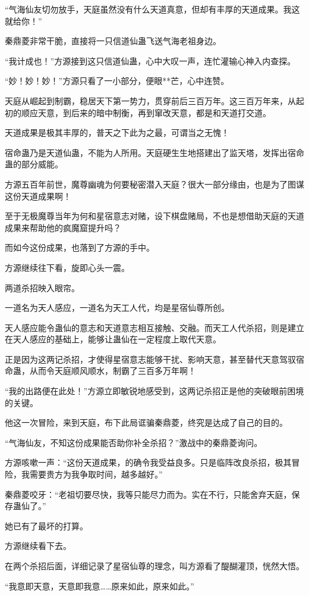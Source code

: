 \begin{this_body}
“气海仙友切勿放手，天庭虽然没有什么天道真意，但却有丰厚的天道成果。我这就给你！”

秦鼎菱非常干脆，直接将一只信道仙蛊飞送气海老祖身边。

“我计成也！”方源接到这只信道仙蛊，心中大叹一声，连忙灌输心神入内查探。

“妙！妙！妙！”方源只看了一小部分，便眼**芒，心中连赞。

天庭从崛起到制霸，稳居天下第一势力，贯穿前后三百万年。这三百万年来，从起初的顺应天意，到后来的暗中制衡，再到窜改天意，都是和天道打交道。

天道成果是极其丰厚的，普天之下此为之最，可谓当之无愧！

宿命蛊乃是天道仙蛊，不能为人所用。天庭硬生生地搭建出了监天塔，发挥出宿命蛊的部分威能。

方源五百年前世，魔尊幽魂为何要秘密潜入天庭？很大一部分缘由，也是为了图谋这份天道成果啊！

至于无极魔尊当年为何和星宿意志对赌，设下棋盘赌局，不也是想借助天庭的天道成果来帮助他的疯魔窟提升吗？

而如今这份成果，也落到了方源的手中。

方源继续往下看，旋即心头一震。

两道杀招映入眼帘。

一道名为天人感应，一道名为天工人代，均是星宿仙尊所创。

天人感应能令蛊仙的意志和天道意志相互接触、交融。而天工人代杀招，则是建立在天人感应的基础上，能够让蛊仙在一定程度上取代天意。

正是因为这两记杀招，才使得星宿意志能够干扰、影响天意，甚至替代天意驾驭宿命蛊，从而令天庭顺风顺水，制霸了三百多万年啊！

“我的出路便在此处！”方源立即敏锐地感受到，这两记杀招正是他的突破眼前困境的关键。

他这一次冒险，来到天庭，布下此局诓骗秦鼎菱，终究是达成了自己的目的。

“气海仙友，不知这份成果能否助你补全杀招？”激战中的秦鼎菱询问。

方源咳嗽一声：“这份天道成果，的确令我受益良多。只是临阵改良杀招，极其冒险，我需要贵方为我争取时间，越多越好。”

秦鼎菱咬牙：“老祖切要尽快，我等只能尽力而为。实在不行，只能舍弃天庭，保存蛊仙了。”

她已有了最坏的打算。

方源继续看下去。

在两个杀招后面，详细记录了星宿仙尊的理念，叫方源看了醍醐灌顶，恍然大悟。

“我意即天意，天意即我意……原来如此，原来如此。”


\end{this_body}
